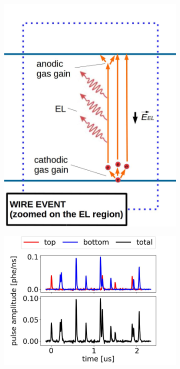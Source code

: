 \begin{figure}[!htbp]
\begin{subfigure}[b]{\figurewidth}
	\includegraphics[width=\halfwidth,clip,trim={0 0 0 0}]{Figures/GasTest/WeiDrawEvent/WirePhotoZ.jpg}
		\caption{}
		\label{fig:ElectronEmissionPulse b}
	\end{subfigure}
    \par\bigskip
	\begin{subfigure}[b]{0.8\textwidth}
	\centering
	\includegraphics[width=\figurewidth,clip,trim={0 0 0 0}]{Figures/GasTest/exampleWaveforms/proc64767id00000197.jpg}%

\end{subfigure}
\end{figure}

